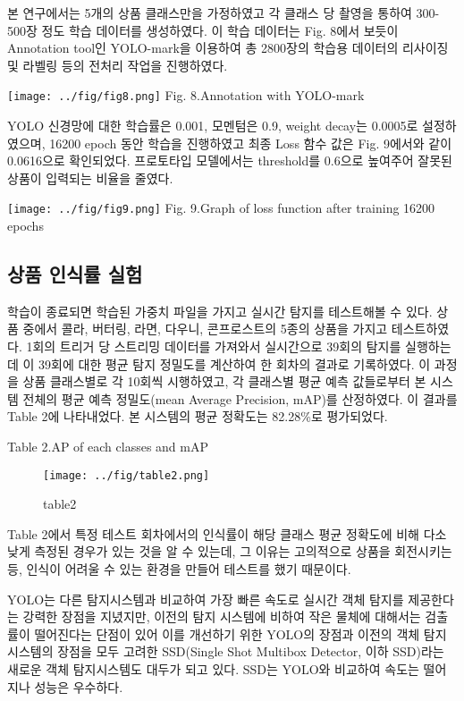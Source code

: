 \documentclass[smallextended]{svjour3}       %
\begin{document}
본 연구에서는 5개의 상품 클래스만을 가정하였고 각 클래스 당 촬영을
통하여 300-500장 정도 학습 데이터를 생성하였다. 이 학습 데이터는 Fig.
8에서 보듯이 Annotation tool인 YOLO-mark을 이용하여 총 2800장의 학습용
데이터의 리사이징 및 라벨링 등의 전처리 작업을 진행하였다.

\texttt{[image: ../fig/fig8.png]} Fig. 8.Annotation with YOLO-mark

YOLO 신경망에 대한 학습률은 0.001, 모멘텀은 0.9, weight decay는 0.0005로
설정하였으며, 16200 epoch 동안 학습을 진행하였고 최종 Loss 함수 값은
Fig. 9에서와 같이 0.0616으로 확인되었다. 프로토타입 모델에서는
threshold를 0.6으로 높여주어 잘못된 상품이 입력되는 비율을 줄였다.

\texttt{[image: ../fig/fig9.png]} Fig. 9.Graph of loss function after
training 16200 epochs

\hypertarget{uxc0c1uxd488-uxc778uxc2dduxb960-uxc2e4uxd5d8}{%
\subsection{상품 인식률
실험}\label{uxc0c1uxd488-uxc778uxc2dduxb960-uxc2e4uxd5d8}}

학습이 종료되면 학습된 가중치 파일을 가지고 실시간 탐지를 테스트해볼 수
있다. 상품 중에서 콜라, 버터링, 라면, 다우니, 콘프로스트의 5종의 상품을
가지고 테스트하였다. 1회의 트리거 당 스트리밍 데이터를 가져와서
실시간으로 39회의 탐지를 실행하는데 이 39회에 대한 평균 탐지 정밀도를
계산하여 한 회차의 결과로 기록하였다. 이 과정을 상품 클래스별로 각
10회씩 시행하였고, 각 클래스별 평균 예측 값들로부터 본 시스템 전체의
평균 예측 정밀도(mean Average Precision, mAP)를 산정하였다. 이 결과를
Table 2에 나타내었다. 본 시스템의 평균 정확도는 82.28\%로 평가되었다.

Table 2.AP of each classes and mAP

\begin{figure}
\centering
\texttt{[image: ../fig/table2.png]}
\caption{table2}
\end{figure}

Table 2에서 특정 테스트 회차에서의 인식률이 해당 클래스 평균 정확도에
비해 다소 낮게 측정된 경우가 있는 것을 알 수 있는데, 그 이유는
고의적으로 상품을 회전시키는 등, 인식이 어려울 수 있는 환경을 만들어
테스트를 했기 때문이다.

YOLO는 다른 탐지시스템과 비교하여 가장 빠른 속도로 실시간 객체 탐지를
제공한다는 강력한 장점을 지녔지만, 이전의 탐지 시스템에 비하여 작은
물체에 대해서는 검출률이 떨어진다는 단점이 있어 이를 개선하기 위한
YOLO의 장점과 이전의 객체 탐지 시스템의 장점을 모두 고려한 SSD(Single
Shot Multibox Detector, 이하 SSD)라는 새로운 객체 탐지시스템도 대두가
되고 있다. SSD는 YOLO와 비교하여 속도는 떨어지나 성능은
우수하다\cite{ren2015faster, liu2016ssd}.
\end{document}
